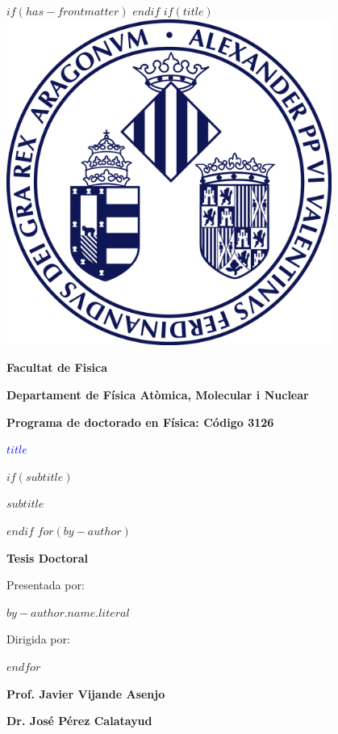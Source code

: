 $if(has-frontmatter)$
\frontmatter
$endif$
$if(title)$
\thispagestyle{empty}
\centering
\vspace*{-1cm} %
\includegraphics[width=0.8\textwidth]{logouni} %
\vfill
{\Large\bfseries Facultat de Fisica \par}
{\Large\bfseries Departament de Física Atòmica, Molecular i Nuclear \par}
{\Large\bfseries Programa de doctorado en Física: Código 3126 \par}
{\textcolor{blue}{\Huge\bfseries $title$} \par}
$if(subtitle)$
\vspace{3ex}
{\Large\bfseries $subtitle$ \par}
$endif$
\vspace{3ex}
$for(by-author)$
{\Large\bfseries Tesis Doctoral \par}
{\Large Presentada por: \par}
{\Large\bfseries $by-author.name.literal$ \par}
{\Large Dirigida por: \par}
\vspace{3ex}
$endfor$%
\begin{minipage}[t]{0.4\textwidth}
    \centering
    {\Large\bfseries Prof. Javier Vijande Asenjo \par}
\end{minipage}
\hfill
\begin{minipage}[t]{0.4\textwidth}
    \centering
    {\Large\bfseries Dr. José Pérez Calatayud \par}
\end{minipage}

